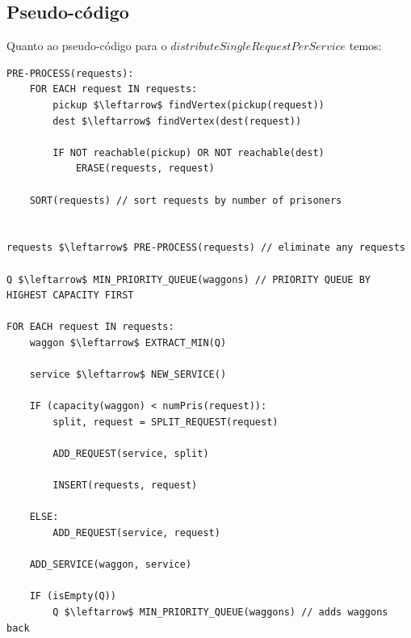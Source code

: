\documentclass[article, a4paper, 12pt, oneside]{memoir}
\begin{document}
\subsection{Pseudo-código}
Quanto ao pseudo-código para o $distributeSingleRequestPerService$ temos:\\
\begin{lstlisting}[frame=single, mathescape=true]
PRE-PROCESS(requests):
	FOR EACH request IN requests:
		pickup $\leftarrow$ findVertex(pickup(request))
		dest $\leftarrow$ findVertex(dest(request))
		
		IF NOT reachable(pickup) OR NOT reachable(dest)
			ERASE(requests, request)

	SORT(requests) // sort requests by number of prisoners


requests $\leftarrow$ PRE-PROCESS(requests) // eliminate any requests 

Q $\leftarrow$ MIN_PRIORITY_QUEUE(waggons) // PRIORITY QUEUE BY HIGHEST CAPACITY FIRST

FOR EACH request IN requests:
	waggon $\leftarrow$ EXTRACT_MIN(Q)
	
	service $\leftarrow$ NEW_SERVICE()
	
	IF (capacity(waggon) < numPris(request)):
		split, request = SPLIT_REQUEST(request)
		
		ADD_REQUEST(service, split)
		
		INSERT(requests, request)
		
	ELSE:
		ADD_REQUEST(service, request)
		
	ADD_SERVICE(waggon, service)
	
	IF (isEmpty(Q))
		Q $\leftarrow$ MIN_PRIORITY_QUEUE(waggons) // adds waggons back
		
\end{lstlisting}
\end{document}
